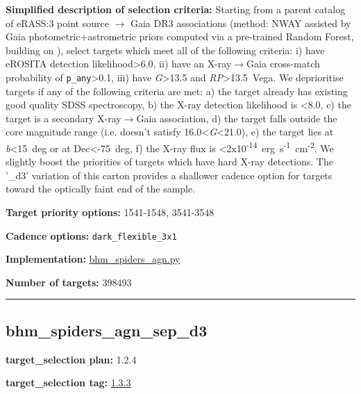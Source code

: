 \noindent\textbf{Simplified description of selection criteria:} Starting from a
parent catalog of eRASS:3 point source $\rightarrow$ Gaia DR3 associations (method:
NWAY assisted by Gaia photometric+astrometric priors computed via a
pre-trained Random Forest, building on
\citealt{Salvato2022}), select targets which meet all of the following criteria:
i) have eROSITA detection likelihood\textgreater6.0, ii) have an
X-ray$\rightarrow$Gaia cross-match probability of \texttt{p\_any}\textgreater0.1,
iii) have \emph{G}\textgreater13.5 and \emph{RP}\textgreater13.5~Vega.
We deprioritise targets if any of the following criteria are met: a) the
target already has existing good quality SDSS spectroscopy, b) the X-ray
detection likelihood is \textless8.0, c) the target is a secondary
X-ray$\rightarrow$Gaia association, d) the target falls outside the core magnitude
range (i.e. doesn't satisfy 16.0\textless{}\emph{G}\textless21.0), e)
the target lies at \textbar{}\emph{b}\textbar\textless15~deg or at
Dec\textless-75~deg, f) the X-ray flux is
\textless2x10\textsuperscript{-14}~erg~s\textsuperscript{-1}~cm\textsuperscript{-2}.
We slightly boost the priorities of targets which have hard X-ray
detections. The '\_d3' variation of this carton provides a shallower
cadence option for targets toward the optically faint end of the sample.


\noindent\textbf{Target priority options:} 1541-1548, 3541-3548

\noindent\textbf{Cadence options:} \texttt{dark\_flexible\_3x1}

\noindent\textbf{Implementation:}
\href{https://github.com/sdss/target_selection/blob/1.3.3/python/target_selection/cartons/bhm_spiders_agn.py}{bhm\_spiders\_agn.py}

\noindent\textbf{Number of targets:} 398493

\begin{center}\rule{0.5\linewidth}{0.5pt}\end{center}

\hypertarget{bhm_spiders_agn_sep_d3_plan1.2.4}{%
\subsection{bhm\_spiders\_agn\_sep\_d3}\label{bhm_spiders_agn_sep_d3_plan1.2.4}}

\noindent\textbf{target\_selection plan:} 1.2.4

\noindent\textbf{target\_selection tag:}
\href{https://github.com/sdss/target_selection/tree/1.3.3/}{1.3.3}

